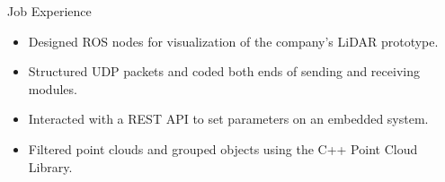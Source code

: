 \begin{rubric}{Job Experience}
\begin{itemize}[leftmargin=*, rightmargin=1cm]
	\item Designed ROS nodes for visualization of the company's LiDAR prototype.  
	\item Structured UDP packets and coded both ends of sending and receiving modules.
	\item Interacted with a REST API to set parameters on an embedded system.
	\item Filtered point clouds and grouped objects using the C++ Point Cloud Library.  
\end{itemize}
\begin{comment}
%
%
\entry*[] \textbf{Creative Edge LLC} \hfill 08.2017 -- 09.2018 \newline
\textit{Software Engineer} \hfill Denver, USA \newline
\vspace{\CVItemizeHeaderSpacing} \begin{itemize}[leftmargin=*, rightmargin=1cm]
	\setlength{\itemsep}{\CVItemizeSpacing}
	\item Developed applications for cryptocurrency mining in both Windows and Linux.  
	\item Wrote software managing OS drivers, system configurations, and 3rd party tools.
\end{itemize}
\end{comment}
\end{rubric}
